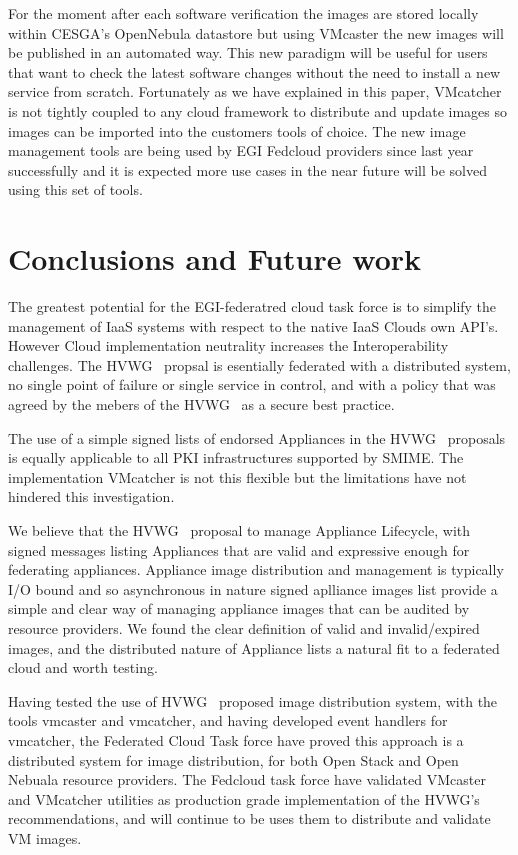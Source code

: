 \documentclass[oribibl]{llncs}
\begin{document}
For the moment after each software verification the images are stored locally within CESGA's OpenNebula datastore but using VMcaster the new images will be published in an automated way.
This new paradigm will be useful for users that want to check the latest software changes without the need to install a new service from scratch.
Fortunately as we have explained in this paper, VMcatcher is not tightly coupled to any cloud framework to distribute and update images so images can be imported into the customers tools of choice. The new image management tools are being used by EGI Fedcloud providers since last year successfully and it is expected more use cases in the near future will be solved using this set of tools.

\section{Conclusions and Future work}
\label{sect-conclusions}
The greatest potential for the EGI-federatred cloud task force is to simplify the management of IaaS systems with respect to the native IaaS Clouds own API's. However Cloud implementation neutrality increases the Interoperability challenges. The HVWG~\cite{hepix} propsal is esentially federated with a distributed system, no single point of failure or single service in control, and with a policy that was agreed by the mebers of the HVWG~\cite{hepix} as a secure best practice.

The use of a simple signed lists of endorsed Appliances in the HVWG~\cite{hepix} proposals is equally applicable to all PKI infrastructures supported by SMIME. The implementation VMcatcher is not this flexible but the limitations have not hindered this investigation.

We believe that the HVWG ~\cite{hepix}proposal to manage Appliance Lifecycle, with signed messages listing Appliances that are valid and expressive enough for federating appliances. Appliance image distribution and management is typically I/O bound and so asynchronous in nature signed aplliance images list provide a simple and clear way of managing appliance images that can be audited by resource providers. We found the clear definition of valid and invalid/expired images, and the distributed nature of Appliance lists a natural fit to a federated cloud and worth testing.

Having tested the use of HVWG~\cite{hepix} proposed image distribution system, with the tools vmcaster and vmcatcher, and having developed event handlers for vmcatcher, the Federated Cloud Task force have proved this approach is a distributed system for image distribution, for both Open Stack and Open Nebuala resource providers. The Fedcloud task force have validated VMcaster and VMcatcher utilities as production grade implementation of the HVWG's~\cite{hepix} recommendations, and will continue to be uses them to distribute and validate VM images.
\end{document}
